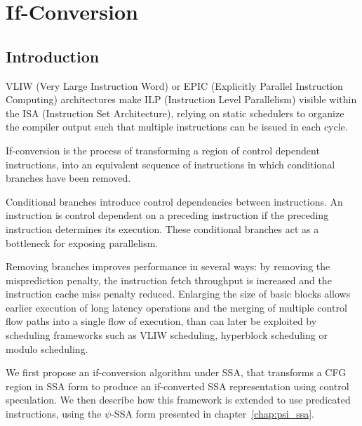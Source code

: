\chapter{If-Conversion }\label{chap:if_conversion}
\label{chap:if_conv}
\graphicspath{{img/}{if_conversion/img/}{part4/if_conversion/img/}}

\newcommand\cond{~?~}
\newcommand{\annotation}[1]{%
  \marginpar{\small\itshape\color{red}#1}}



\section{Introduction}

VLIW (Very Large Instruction Word) or EPIC (Explicitly Parallel Instruction Computing) architectures make ILP (Instruction Level Parallelism) visible within the ISA (Instruction Set Architecture), relying on static schedulers to organize the compiler output such that multiple instructions can be issued in each cycle.

If-conversion is the process of transforming a region of control dependent instructions, into an equivalent sequence of instructions in which conditional branches have been removed.

Conditional branches introduce control dependencies between instructions. An instruction is control dependent on a preceding instruction if the preceding instruction determines its execution. These conditional branches act as a bottleneck for exposing parallelism.

Removing branches improves performance in several ways: by removing the misprediction penalty, the instruction fetch throughput is increased and the instruction cache miss penalty reduced. Enlarging the size of basic blocks allows earlier execution of long latency operations and the merging of multiple control flow paths into a single flow of execution, than can later be exploited by scheduling frameworks such as VLIW scheduling, hyperblock scheduling or modulo scheduling.

We first propose an if-conversion algorithm under SSA, that transforms a CFG region in SSA form to produce an if-converted SSA representation using control speculation.
We then describe how this framework is extended to use predicated instructions, using the $\psi$-SSA form presented in chapter~\ref{chap:psi_ssa}.

